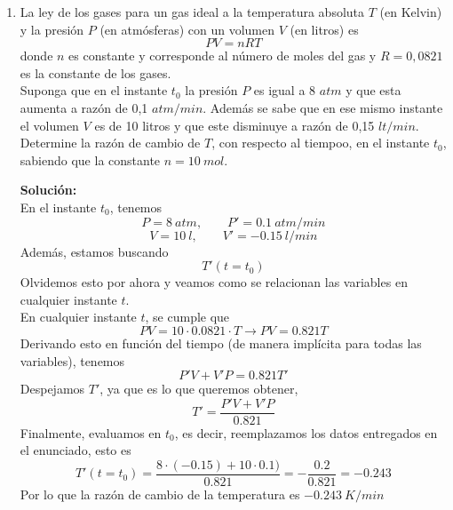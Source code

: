 \documentclass[12pt]{article}
\newenvironment{solucion}
{\begin{mdframed}[backgroundcolor=black!10]
		{\bf Solución:}\\
	}
	{
	\end{mdframed}
}
\newenvironment{preguntas}
{\begin{enumerate}\itemsep12pt
	}
	{
	\end{enumerate}
}
\newcommand{\ra}{\rightarrow}
\newcommand{\lh}{\stackrel{L'H}{=}}
\begin{document}
\begin{preguntas}
\begin{solucion}
Por último, buscamos asíntotas oblicuas con
$$m = 
\lim\limits_{x \ra \pm \infty} \dfrac{f(x)}{x} =
\lim\limits_{x \ra \pm \infty} \dfrac{xe^{1/x}}{x} =
\lim\limits_{x \ra \pm \infty} e^{1/x} =
1$$
$$n = 
\lim\limits_{x \ra \pm \infty} f(x) - mx =
\lim\limits_{x \ra \pm \infty} xe^{1/x} - x =
\lim\limits_{x \ra \pm \infty} x(e^{1/x} - 1) =
\lim\limits_{x \ra \pm \infty} \dfrac{e^{1/x} - 1}{\dfrac{1}{x}}$$
$$\lh
\lim\limits_{x \ra \pm \infty} \dfrac{-\dfrac{e^{1/x}}{x^2}}{-\dfrac{1}{x^2}} =
\lim\limits_{x \ra \pm \infty} e^{1/x} = 1
$$
Por lo que $y = x + 1$ es asíntota oblicua.
\end{solucion}
\item La ley de los gases para un gas ideal a la temperatura absoluta $T$ (en Kelvin) y la presión $P$ (en atmósferas) con un volumen $V$ (en litros) es
$$PV = nRT$$
donde $n$ es constante y corresponde al número de moles del gas y $R = 0,0821$ es la constante de los gases.\\
Suponga que en el instante $t_0$ la presión $P$ es igual a 8 $atm$ y que esta aumenta a razón de 0,1 $atm/min$. Además se sabe que en ese mismo instante el volumen $V$ es de 10 litros y que este disminuye a razón de 0,15 $lt/min$.\\
Determine la razón de cambio de $T$, con respecto al tiempoo, en el instante $t_0$, sabiendo que la constante $n = 10\ mol$.
\begin{solucion}
En el instante $t_0$, tenemos
$$P = 8\ atm, \qquad P' = 0.1\ atm/min$$
$$V = 10\ l, \qquad V' = -0.15\ l/min$$
Además, estamos buscando
$$T'(t=t_0)$$
Olvidemos esto por ahora y veamos como se relacionan las variables en cualquier instante $t$.\\

En cualquier instante $t$, se cumple que
$$PV = 10 \cdot 0.0821 \cdot T \ra PV = 0.821 T $$
Derivando esto en función del tiempo (de manera implícita para todas las variables), tenemos
$$P'V + V'P = 0.821T'$$
Despejamos $T'$, ya que es lo que queremos obtener,
$$T' = \dfrac{P'V + V'P}{0.821}$$
Finalmente, evaluamos en $t_0$, es decir, reemplazamos los datos entregados en el enunciado, esto es
$$T'(t=t_0) = \dfrac{8 \cdot (-0.15) + 10 \cdot 0.1)}{0.821} = -\dfrac{0.2}{0.821} = -0.243$$
Por lo que la razón de cambio de la temperatura es $-0.243\ K/min$
\end{solucion}
\end{preguntas}
\end{document}

